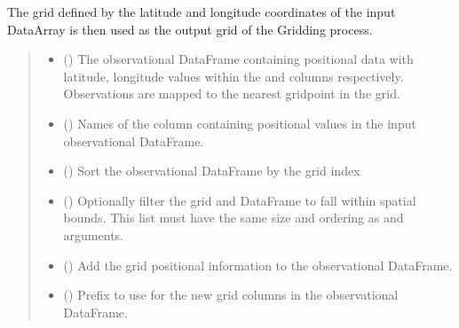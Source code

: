 \documentclass[letterpaper,10pt,english]{sphinxmanual}
\begin{document}
\begin{fulllineitems}
\begin{fulllineitems}
\sphinxAtStartPar
The grid defined by the latitude and longitude coordinates of the input
DataArray is then used as the output grid of the Gridding process.
\begin{quote}\begin{description}
\begin{itemize}
\item {}
\sphinxAtStartPar
{} () \textendash{} The observational DataFrame containing positional data with
latitude, longitude values within the  and
 columns respectively. Observations are mapped to the
nearest grid\sphinxhyphen{}point in the grid.

\item {}
\sphinxAtStartPar
{} () \textendash{} Names of the column containing positional values in the input
observational DataFrame.

\item {}
\sphinxAtStartPar
{} () \textendash{} Sort the observational DataFrame by the grid index

\item {}
\sphinxAtStartPar
{} () \textendash{} Optionally filter the grid and DataFrame to fall within spatial
bounds. This list must have the same size and ordering as
 and  arguments.

\item {}
\sphinxAtStartPar
{} () \textendash{} Add the grid positional information to the observational DataFrame.

\item {}
\sphinxAtStartPar
{} () \textendash{} Prefix to use for the new grid columns in the observational
DataFrame.


\end{itemize}
\end{description}
\end{quote}
\end{fulllineitems}
\end{fulllineitems}
\end{document}
